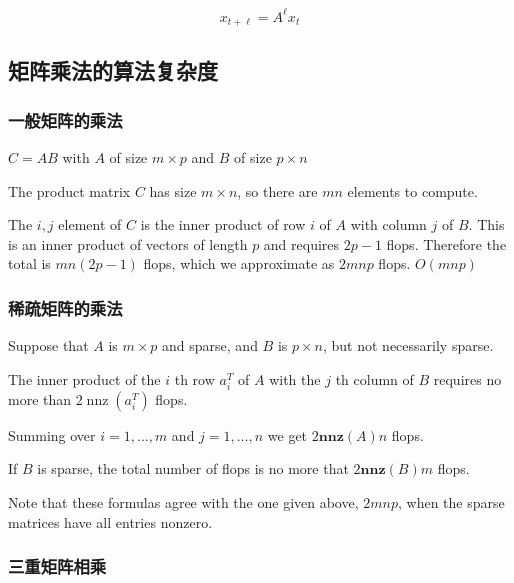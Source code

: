 \begin{example}
    $$ x_{t+\ell}=A^{\ell} x_{t} $$
\end{example}

\subsection{矩阵乘法的算法复杂度}

\subsubsection{一般矩阵的乘法}

$ C=A B $ with $ A $ of size $ m \times p $ and $ B $ of size $ p \times n $

The product matrix $ C $ has size $ m \times n $, so there are $ m n $ elements to compute. 

The $ i, j $ element of $ C $ is the inner product of row $ i $ of $ A $ with column $ j $ of $ B . $ This is an inner product of vectors of length $ p $ and requires $ 2 p-1 $ flops. Therefore the total is $ m n(2 p-1) $ flops, which we approximate as $ 2 m n p $ flops. $O(mnp)$

\subsubsection{稀疏矩阵的乘法}

Suppose that $ A $ is $ m \times p $ and sparse, and $ B $ is $ p \times n $, but not necessarily sparse. 

The inner product of the $ i $ th row $ a_{i}^{T} $ of $ A $ with the $ j $ th column of $ B $ requires no more than $ 2 \operatorname{nnz}\left(a_{i}^{T}\right) $ flops. 

Summing over $ i=1, \ldots, m $ and $ j=1, \ldots, n $ we get $ 2 \mathbf{n n z}(A) n $ flops. 

If $ B $ is sparse, the total number of flops is no more that $ 2 \mathbf{n n z}(B) m $ flops. 

\begin{remark}
    Note that these formulas agree with the one given above, $ 2 m n p $, when the sparse matrices have all entries nonzero.
\end{remark}

\subsubsection{三重矩阵相乘}

